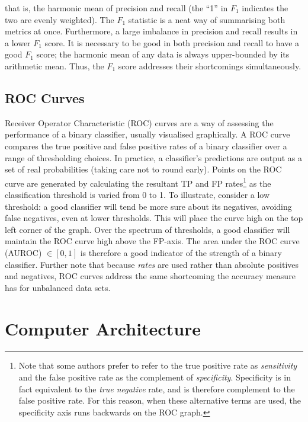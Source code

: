\documentclass[11pt]{amsart}
\begin{document}
that is, the harmonic mean of precision and recall (the ``1'' in $F_1$ indicates the two are evenly weighted). The $F_1$ statistic is a neat way of summarising both metrics at once. Furthermore, a large imbalance in precision and recall results in a lower $F_1$ score. It is necessary to be good in both precision and recall to have a good $F_1$ score; the harmonic mean of any data is always upper-bounded by its arithmetic mean. Thus, the $F_1$ score addresses their shortcomings simultaneously.

\subsection{ROC Curves}

Receiver Operator Characteristic (ROC) curves are a way of assessing the performance of a binary classifier, usually visualised graphically. A ROC curve compares the true positive and false positive rates of a binary classifier over a range of thresholding choices. In practice, a classifier's predictions are output as a set of real probabilities (taking care not to round early). Points on the ROC curve are generated by calculating the resultant TP and FP rates\footnote{Note that some authors prefer to refer to the true positive rate as \emph{sensitivity} and the false positive rate as the complement of \emph{specificity}. Specificity is in fact equivalent to the \emph{true negative} rate, and is therefore complement to the false positive rate. For this reason, when these alternative terms are used, the specificity axis runs backwards on the ROC graph.} as the classification threshold is varied from 0 to 1. To illustrate, consider a low threshold: a good classifier will tend be more sure about its negatives, avoiding false negatives, even at lower thresholds. This will place the curve high on the top left corner of the graph. Over the spectrum of thresholds, a good classifier will maintain the ROC curve high above the FP-axis. The area under the ROC curve (AUROC) $\in [0, 1]$ is therefore a good indicator of the strength of a binary classifier. Further note that because \emph{rates} are used rather than absolute positives and negatives, ROC curves address the same shortcoming the accuracy measure has for unbalanced data sets.

\section{Computer Architecture}
\end{document}
